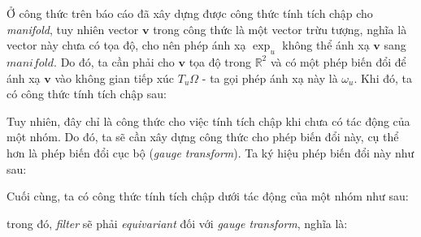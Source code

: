 Ở công thức trên báo cáo đã xây dựng được công thức tính tích chập cho \textit{manifold}, tuy nhiên vector $\mathbf{v}$ trong công thức là một vector trừu tượng, nghĩa là vector này chưa có tọa độ, cho nên phép ánh xạ $\exp_u$ không thể ánh xạ $\mathbf{v}$ sang $manifold$. Do đó, ta cần phải cho $\mathbf{v}$ tọa độ trong $\mathbb{R}^2$ và có một phép biến đổi để ánh xạ $\mathbf{v}$ vào không gian tiếp xúc $T_u \Omega$ - ta gọi phép ánh xạ này là $\omega_u$. Khi đó, ta có công thức tính tích chập sau:
\begin{center}
    \vspace{-0.5cm}
\end{center}
\vspace{-0.5cm}
Tuy nhiên, đây chỉ là công thức cho việc tính tích chập khi chưa có tác động của một nhóm. Do đó, ta sẽ cần xây dựng công thức cho phép biến đổi này, cụ thể hơn là phép biến đổi cục bộ (\textit{gauge transform}). Ta ký hiệu phép biến đổi này như sau:
\begin{center}
    \vspace{-0.5cm}
\end{center}
\vspace{-0.5cm}
Cuối cùng, ta có công thức tính tích chập dưới tác động của một nhóm như sau:
\begin{center}
\end{center}
trong đó, \textit{filter} sẽ phải \textit{equivariant} đối với \textit{gauge transform}, nghĩa là:
\begin{center}
\end{center}
